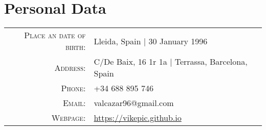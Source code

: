 \section{Personal Data}
\begin{center}
\begin{tabular}{ r l }
	\textsc{Place an date of birth:} 	& Lleida, Spain | 30 January 1996 	\\
	\textsc{Address:}			& C/De Baix, 16 1r 1a | Terrassa, Barcelona, Spain\\
	\textsc{Phone:}				& +34 688 895 746 			\\
	\textsc{Email:}				& valcazar96@gmail.com 			\\
	\textsc{Webpage:}			& \url{https://vikepic.github.io}			\\
\end{tabular}
\end{center}
